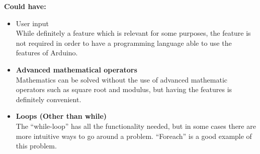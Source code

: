 \textbf{Could have:}
\begin{itemize}
\item User input \\
While definitely a feature which is relevant for some purposes, the feature is not required in order to have a programming language able to use the features of Arduino. \\

\item \textbf{Advanced mathematical operators} \\
Mathematics can be solved without the use of advanced mathematic operators such as square root and modulus, but having the features is definitely convenient. \\

\item \textbf{Loops (Other than while)} \\
The ``while-loop'' has all the functionality needed, but in some cases there are more intuitive ways to go around a problem. ``Foreach'' is a good example of this problem.\\
\end{itemize}